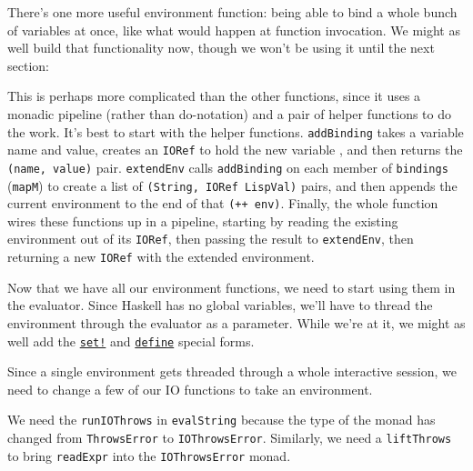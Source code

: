 There's one more useful environment function: being able to bind a whole bunch of variables at once, like what would happen at function invocation. We might as well build that functionality now, though we won't be using it until the next section:
 
 
This is perhaps more complicated than the other functions, since it uses a monadic pipeline (rather than do-notation) and a pair of helper functions to do the work. It's best to start with the helper functions. \verb|addBinding| takes a variable name and value, creates an \verb|IORef| to hold the new variable , and then returns the \verb|(name, value)| pair. \verb|extendEnv| calls \verb|addBinding| on each member of \verb|bindings| (\verb|mapM|) to create a list of \verb|(String, IORef LispVal)| pairs, and then appends the current environment to the end of that \lstinline|(++ env)|. Finally, the whole function wires these functions up in a pipeline, starting by reading the existing environment out of its \verb|IORef|, then passing the result to \verb|extendEnv|, then returning a new \verb|IORef| with the extended environment.
 
Now that we have all our environment functions, we need to start using them in the evaluator. Since Haskell has no global variables, we'll have to thread the environment through the evaluator as a parameter. While we're at it, we might as well add the \href{http://www.schemers.org/Documents/Standards/R5RS/HTML/r5rs-Z-H-7.html\#\%_sec_4.1.6}{\texttt{set!}} and \href{http://www.schemers.org/Documents/Standards/R5RS/HTML/r5rs-Z-H-8.html\#\%_sec_5.2}{\texttt{define}} special forms.
 
 
Since a single environment gets threaded through a whole interactive session, we need to change a few of our IO functions to take an environment.
 
 
We need the \verb|runIOThrows| in \verb|evalString| because the type of the monad has changed from \verb|ThrowsError| to \verb|IOThrowsError|. Similarly, we need a \verb|liftThrows| to bring \verb|readExpr| into the \verb|IOThrowsError| monad.
 
